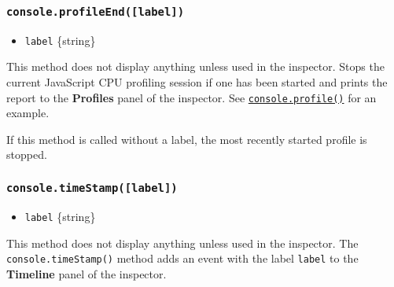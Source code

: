\subsubsection{\texorpdfstring{\texttt{console.profileEnd({[}label{]})}}{console.profileEnd({[}label{]})}}\label{console.profileendlabel}

\begin{itemize}
\tightlist
\item
  \texttt{label} \{string\}
\end{itemize}

This method does not display anything unless used in the inspector.
Stops the current JavaScript CPU profiling session if one has been
started and prints the report to the \textbf{Profiles} panel of the
inspector. See
\hyperref[consoleprofilelabel]{\texttt{console.profile()}} for an
example.

If this method is called without a label, the most recently started
profile is stopped.

\subsubsection{\texorpdfstring{\texttt{console.timeStamp({[}label{]})}}{console.timeStamp({[}label{]})}}\label{console.timestamplabel}

\begin{itemize}
\tightlist
\item
  \texttt{label} \{string\}
\end{itemize}

This method does not display anything unless used in the inspector. The
\texttt{console.timeStamp()} method adds an event with the label
\texttt{\textquotesingle{}label\textquotesingle{}} to the
\textbf{Timeline} panel of the inspector.
